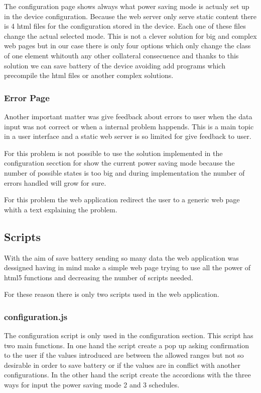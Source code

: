 		The configuration page shows always what power saving mode is actualy set up in the device configuration. Because the web server only serve static content there is 4 html files for the configuration stored in the device. Each one of these files change the actual selected mode. This is not a clever solution for big and complex web pages but in our case there is only four options which only change the class of one element whitouth any other collateral consecuence and thanks to this solution we can save battery of the device avoiding add programs which precompile the html files or another complex solutions.

		\subsubsection{Error Page}
		Another important matter was give feedback about errors to user when the data input was not correct or when a internal problem happends. This is a main topic in a user interface and a static web server is so limited for give feedback to user.

		For this problem is not possible to use the solution implemented in the configuration secction for show the current power saving mode because the number of possible states is too big and during implementation the number of errors handled will grow for sure.

		For this problem the web application redirect the user to a generic web page whith a text explaining the problem.

		\subsection{Scripts}
		With the aim of save battery sending so many data the web application was dessigned having in mind make a simple web page trying to use all the power of html5 functions and decreasing the number of scripts needed.

		For these reason there is only two scripts used in the web application.

		\subsubsection{configuration.js}
		The configuration script is only used in the configuration section. This script has two main functions. In one hand the script create a pop up asking confirmation to the user if the values introduced are between the allowed ranges but not so desirable in order to save battery or if the values are in conflict with another configurations. In the other hand the script create the accordions with the three ways for input the power saving mode 2 and 3 schedules.

